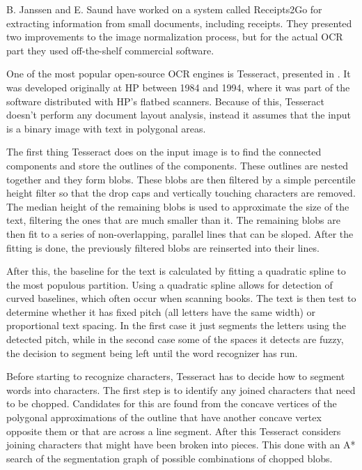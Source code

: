 B. Janssen and E. Saund have worked on a system called Receipts2Go\cite{janssen2012receipts2go} for extracting information from small documents, including receipts. They presented two improvements to the image normalization process, but for the actual OCR part they used off-the-shelf commercial software. 

One of the most popular open-source OCR engines is Tesseract, presented in \cite{smith2007overview}. It was developed originally at HP between 1984 and 1994, where it was part of the software distributed with HP's flatbed scanners. Because of this, Tesseract doesn't perform any document layout analysis, instead it assumes that the input is a binary image with text in polygonal areas. 

The first thing Tesseract does on the input image is to find the connected components and store the outlines of the components. These outlines are nested together and they form blobs. These blobs are then filtered by a simple percentile height filter so that the drop caps and vertically touching characters are removed. The median height of the remaining blobs is used to approximate the size of the text, filtering the ones that are much smaller than it. The remaining blobs are then fit to a series of non-overlapping, parallel lines that can be sloped. After the fitting is done, the previously filtered blobs are reinserted into their lines. 

After this, the baseline for the text is calculated by fitting a quadratic spline to the most populous partition. Using a quadratic spline allows for detection of curved baselines, which often occur when scanning books. The text is then test to determine whether it has fixed pitch (all letters have the same width) or proportional text spacing. In the first case it just segments the letters using the detected pitch, while in the second case some of the spaces it detects are fuzzy, the decision to segment being left until the word recognizer has run. 

Before starting to recognize characters, Tesseract has to decide how to segment words into characters. The first step is to identify any joined characters that need to be chopped. Candidates for this are found from the concave vertices of the polygonal approximations of the outline that have another concave vertex opposite them or that are across a line segment. After this Tesseract considers joining characters that might have been broken into pieces. This done with an A* search of the segmentation graph of possible combinations of chopped blobs. 

